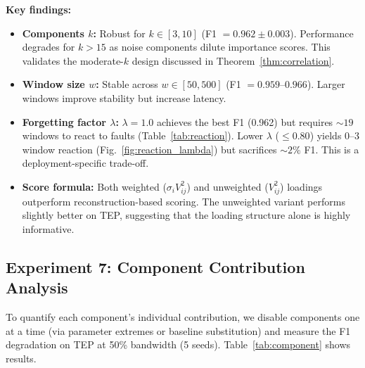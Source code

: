 \documentclass[journal]{IEEEtran}
\begin{document}
\textbf{Key findings:}
\begin{itemize}[leftmargin=*]
\item \textbf{Components $k$:} Robust for $k \in [3, 10]$ (F1 $= 0.962 \pm 0.003$). Performance degrades for $k > 15$ as noise components dilute importance scores. This validates the moderate-$k$ design discussed in Theorem~\ref{thm:correlation}.
\item \textbf{Window size $w$:} Stable across $w \in [50, 500]$ (F1 $= 0.959$--$0.966$). Larger windows improve stability but increase latency.
\item \textbf{Forgetting factor $\lambda$:} $\lambda = 1.0$ achieves the best F1 (0.962) but requires ${\sim}19$ windows to react to faults (Table~\ref{tab:reaction}). Lower $\lambda$ ($\leq 0.80$) yields 0--3 window reaction (Fig.~\ref{fig:reaction_lambda}) but sacrifices ${\sim}2\%$ F1. This is a deployment-specific trade-off.
\item \textbf{Score formula:} Both weighted ($\sigma_i V_{ij}^2$) and unweighted ($V_{ij}^2$) loadings outperform reconstruction-based scoring. The unweighted variant performs slightly better on TEP, suggesting that the loading structure alone is highly informative.
\end{itemize}

\subsection{Experiment 7: Component Contribution Analysis}

To quantify each component's individual contribution, we disable components one at a time (via parameter extremes or baseline substitution) and measure the F1 degradation on TEP at 50\% bandwidth (5 seeds). Table~\ref{tab:component} shows results.
\end{document}
